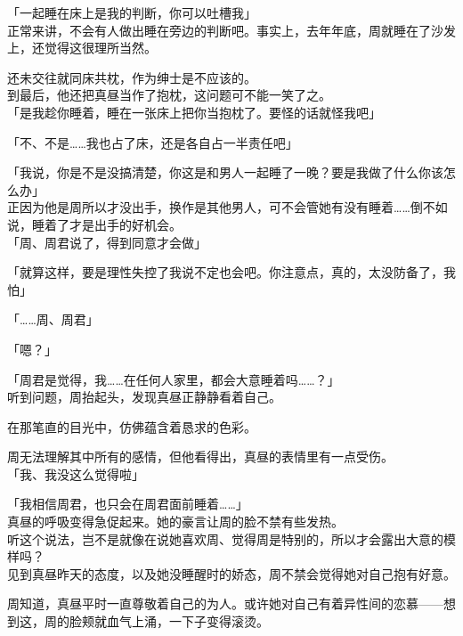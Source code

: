 「一起睡在床上是我的判断，你可以吐槽我」\\

正常来讲，不会有人做出睡在旁边的判断吧。事实上，去年年底，周就睡在了沙发上，还觉得这很理所当然。

还未交往就同床共枕，作为绅士是不应该的。\\

到最后，他还把真昼当作了抱枕，这问题可不能一笑了之。\\

「是我趁你睡着，睡在一张床上把你当抱枕了。要怪的话就怪我吧」

「不、不是……我也占了床，还是各自占一半责任吧」

「我说，你是不是没搞清楚，你这是和男人一起睡了一晚？要是我做了什么你该怎么办」\\

正因为他是周所以才没出手，换作是其他男人，可不会管她有没有睡着……倒不如说，睡着了才是出手的好机会。\\

「周、周君说了，得到同意才会做」

「就算这样，要是理性失控了我说不定也会吧。你注意点，真的，太没防备了，我怕」

「……周、周君」

「嗯？」

「周君是觉得，我……在任何人家里，都会大意睡着吗……？」\\

听到问题，周抬起头，发现真昼正静静看着自己。

在那笔直的目光中，仿佛蕴含着恳求的色彩。

周无法理解其中所有的感情，但他看得出，真昼的表情里有一点受伤。\\

「我、我没这么觉得啦」

「我相信周君，也只会在周君面前睡着……」\\

真昼的呼吸变得急促起来。她的豪言让周的脸不禁有些发热。\\

听这个说法，岂不是就像在说她喜欢周、觉得周是特别的，所以才会露出大意的模样吗？\\

见到真昼昨天的态度，以及她没睡醒时的娇态，周不禁会觉得她对自己抱有好意。

周知道，真昼平时一直尊敬着自己的为人。或许她对自己有着异性间的恋慕——想到这，周的脸颊就血气上涌，一下子变得滚烫。\\

